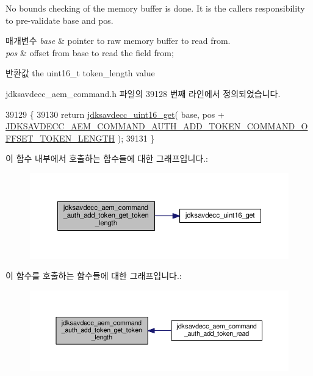 No bounds checking of the memory buffer is done. It is the caller\textquotesingle{}s responsibility to pre-\/validate base and pos.


\begin{DoxyParams}{매개변수}
{\em base} & pointer to raw memory buffer to read from. \\
\hline
{\em pos} & offset from base to read the field from; \\
\hline
\end{DoxyParams}
\begin{DoxyReturn}{반환값}
the uint16\+\_\+t token\+\_\+length value 
\end{DoxyReturn}


jdksavdecc\+\_\+aem\+\_\+command.\+h 파일의 39128 번째 라인에서 정의되었습니다.


\begin{DoxyCode}
39129 \{
39130     \textcolor{keywordflow}{return} \hyperlink{group__endian_ga3fbbbc20be954aa61e039872965b0dc9}{jdksavdecc\_uint16\_get}( base, pos + 
      \hyperlink{group__command__auth__add__token_ga29cf4cd9567a8b8045ffd9e0a2958877}{JDKSAVDECC\_AEM\_COMMAND\_AUTH\_ADD\_TOKEN\_COMMAND\_OFFSET\_TOKEN\_LENGTH}
       );
39131 \}
\end{DoxyCode}


이 함수 내부에서 호출하는 함수들에 대한 그래프입니다.\+:
\nopagebreak
\begin{figure}[H]
\begin{center}
\leavevmode
\includegraphics[width=350pt]{group__command__auth__add__token_ga0b29b7219d1586729f6dffec07fea614_cgraph}
\end{center}
\end{figure}




이 함수를 호출하는 함수들에 대한 그래프입니다.\+:
\nopagebreak
\begin{figure}[H]
\begin{center}
\leavevmode
\includegraphics[width=350pt]{group__command__auth__add__token_ga0b29b7219d1586729f6dffec07fea614_icgraph}
\end{center}
\end{figure}



